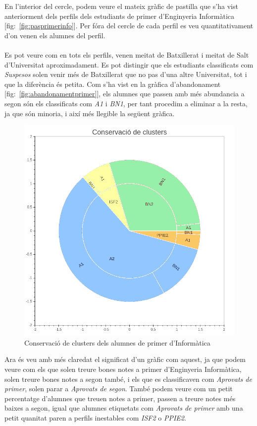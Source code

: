 \documentclass[12pt,a4paper,catalan]{article}
\begin{document}
En l'interior del cercle, podem veure el mateix gràfic de pastilla que s'ha vist anteriorment dels perfils dels estudiants de primer d'Enginyeria Informàtica [fig:~\ref{fig:pasprimerinfo}]. Per fóra del cercle de cada perfil es veu quantitativament d'on venen els alumnes del perfil. 
\\
\\
Es pot veure com en tots els perfils, venen meitat de Batxillerat i meitat de Salt d'Universitat aproximadament. Es pot distingir que els estudiants classificats com \textit{Suspesos} solen venir més de Batxillerat que no pas d'una altre Universitat, tot i que la diferència és petita. Com s'ha vist en la gràfica d'abandonament [fig:~\ref{fig:abandonamentprimer}], els alumnes que passen amb més abundancia a segon són els classificats com \textit{A1} i \textit{BN1}, per tant procedim a eliminar a la resta, ja que són minoria, i així més llegible la següent gràfica.

\begin{figure}[h]
\centering
\includegraphics[width=.6\linewidth]{img/conservacio_clusters_segon_info.png}
\caption{Conservació de clusters dels alumnes de primer d'Informàtica}
\end{figure}

Ara és veu amb més claredat el significat d'un gràfic com aquest, ja que podem veure com els que solen treure bones notes a primer d'Enginyeria Informàtica, solen treure bones notes a segon també, i els que es classificaven com \textit{Aprovats de primer}, solen parar a \textit{Aprovats de segon}. També podem veure com un petit percentatge d'alumnes que treuen notes a primer, passen a treure notes més baixes a segon, igual que alumnes etiquetats com \textit{Aprovats de primer} amb una petit quanitat paren a perfils inestables com \textit{ISF2} o \textit{PPIE2}.
\end{document}
